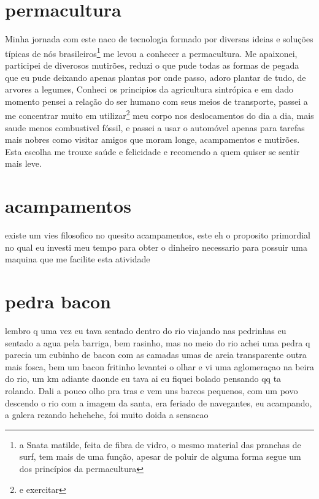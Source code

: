 \documentclass[a4paper]{report}
\begin{document}
\section*{permacultura}
	Minha jornada com este naco de tecnologia formado por diversas ideias e solu\c{c}\~oes t\'ipicas de n\'os brasileiros\footnote{ a Snata matilde, feita de fibra de vidro, o mesmo material das pranchas de surf, tem mais de uma fun\c{c}\~ao, apesar de poluir de alguma forma segue um dos princ\'ipios da permacultura } me levou a conhecer a permacultura.
 	Me apaixonei, participei de diverosos mutir\~oes, reduzi o que pude todas as formas de pegada que eu pude deixando apenas plantas por onde passo, adoro plantar de tudo, de arvores a legumes,
        Conheci os principios da agricultura sintr\'opica e em dado momento pensei a rela\c{c}\~ao do ser humano com seus meios de transporte, passei a me concentrar muito em utilizar\footnote{e exercitar} meu corpo nos deslocamentos do dia a dia, mais saude menos combustivel f\'ossil, e passei a usar o autom\'ovel apenas para tarefas mais nobres como visitar amigos que moram longe, acampamentos e mutir\~oes.
	Esta escolha me trouxe sa\'ude e felicidade e recomendo a quem quiser se sentir mais leve. 


\section*{acampamentos}
	existe um vies filosofico no quesito acampamentos, este eh o proposito primordial no qual eu investi meu tempo para obter o dinheiro necessario para possuir uma maquina que me facilite esta atividade


\section*{pedra bacon}

 lembro q uma vez eu tava sentado dentro do rio viajando nas pedrinhas eu sentado a agua pela barriga, bem rasinho, mas no meio do rio
 achei uma pedra q parecia um cubinho de bacon  com as camadas umas de areia transparente outra mais fosca, bem um bacon fritinho
 levantei o olhar e vi uma aglomeraçao na beira do rio, um km adiante daonde eu tava
 ai eu fiquei bolado pensando qq ta rolando.  Dali a pouco olho pra tras e vem uns barcos pequenos, com um povo descendo o rio
 com a imagem da santa, era feriado de navegantes,  eu acampando,  a galera rezando hehehehe,  foi muito doida a sensacao

 
\end{document}
